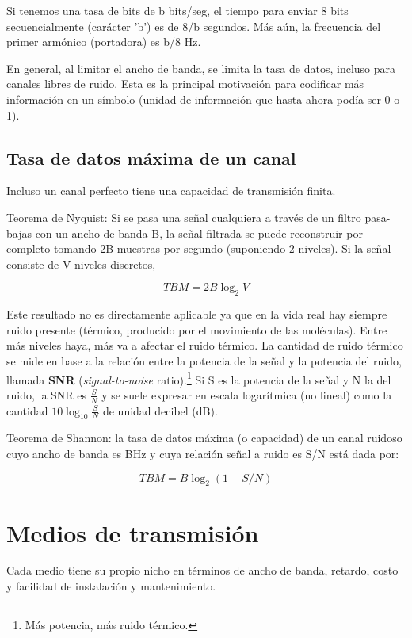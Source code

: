 \documentclass{book}
\begin{document}
	\vspace{3mm}
	Si tenemos una tasa de bits de b bits/seg, el tiempo para enviar 8 bits secuencialmente (carácter 'b') es de 8/b segundos. Más aún, la frecuencia del primer armónico (portadora) es b/8 Hz.
	
	\vspace{3mm}
	En general, al limitar el ancho de banda, se limita la tasa de datos, incluso para canales libres de ruido. Esta es la principal motivación para codificar más información en un símbolo (unidad de información que hasta ahora podía ser 0 o 1).
	
	\pagebreak
	\subsection{Tasa de datos máxima de un canal}
	Incluso un canal perfecto tiene una capacidad de transmisión finita.
	
	\vspace{3mm}
	Teorema de Nyquist: Si se pasa una señal cualquiera a través de un filtro pasa-bajas con un ancho de banda B, la señal filtrada se puede reconstruir por completo tomando 2B muestras por segundo (suponiendo 2 niveles). Si la señal consiste de V niveles discretos,
	
	\begin{equation}
	TBM = 2B\log_{2} V
	\end{equation}
	
	Este resultado no es directamente aplicable ya que en la vida real hay siempre ruido presente (térmico, producido por el movimiento de las moléculas). Entre más niveles haya, más va a afectar el ruido térmico. La cantidad de ruido térmico se mide en base a la relación entre la potencia de la señal y la potencia del ruido, llamada \textbf{SNR} (\textit{signal-to-noise} ratio).\footnote{Más potencia, más ruido térmico.} Si S es la potencia de la señal y N la del ruido, la SNR es $\frac{S}{N}$ y se suele expresar en escala logarítmica (no lineal) como la cantidad $10 \log _{10}\frac{S}{N}$ de unidad decibel (dB).
	
	\vspace{3mm}
	Teorema de Shannon: la tasa de datos máxima (o capacidad) de un canal ruidoso cuyo ancho de banda es BHz y cuya relación señal a ruido es S/N está dada por:
	
	\begin{equation}
	TBM = B\log_{2}(1 + S/N)
	\end{equation}
	
	\section{Medios de transmisión}
	Cada medio tiene su propio nicho en términos de ancho de banda, retardo, costo y facilidad de instalación y mantenimiento.
	
\end{document}
